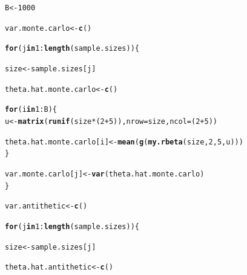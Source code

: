 \documentclass[11pt, a4paper]{article}\usepackage[]{graphicx}\usepackage[]{xcolor}
\makeatletter
\newcommand{\hlnum}[1]{\textcolor[rgb]{0.686,0.059,0.569}{#1}}%
\newcommand{\hlopt}[1]{\textcolor[rgb]{0,0,0}{#1}}%
\newcommand{\hldef}[1]{\textcolor[rgb]{0.345,0.345,0.345}{#1}}%
\newcommand{\hlkwa}[1]{\textcolor[rgb]{0.161,0.373,0.58}{\textbf{#1}}}%
\newcommand{\hlkwb}[1]{\textcolor[rgb]{0.69,0.353,0.396}{#1}}%
\newcommand{\hlkwc}[1]{\textcolor[rgb]{0.333,0.667,0.333}{#1}}%
\newcommand{\hlkwd}[1]{\textcolor[rgb]{0.737,0.353,0.396}{\textbf{#1}}}%
\newenvironment{kframe}{%
 \def\at@end@of@kframe{}%
 \ifinner\ifhmode%
  \def\at@end@of@kframe{\end{minipage}}%
  \begin{minipage}{\columnwidth}%
 \fi\fi%
 \def\FrameCommand##1{\hskip\@totalleftmargin \hskip-\fboxsep
 \colorbox{shadecolor}{##1}\hskip-\fboxsep
     \hskip-\linewidth \hskip-\@totalleftmargin \hskip\columnwidth}%
 \MakeFramed {\advance\hsize-\width
   \@totalleftmargin\z@ \linewidth\hsize
   \@setminipage}}%
 {\par\unskip\endMakeFramed%
 \at@end@of@kframe}
\newenvironment{knitrout}{}{} %
\makeatother
\begin{document}
\begin{enumerate}
\begin{knitrout}
\color{fgcolor}\begin{kframe}
\begin{alltt}
\hldef{B} \hlkwb{<-} \hlnum{1000}
\end{alltt}
\end{kframe}
\end{knitrout}

\begin{knitrout}
\color{fgcolor}\begin{kframe}
\begin{alltt}
\hldef{var.monte.carlo} \hlkwb{<-} \hlkwd{c}\hldef{()}

\hlkwa{for} \hldef{(j} \hlkwa{in} \hlnum{1}\hlopt{:}\hlkwd{length}\hldef{(sample.sizes)) \{}

  \hldef{size} \hlkwb{<-} \hldef{sample.sizes[j]}

  \hldef{theta.hat.monte.carlo} \hlkwb{<-} \hlkwd{c}\hldef{()}

  \hlkwa{for} \hldef{(i} \hlkwa{in} \hlnum{1}\hlopt{:}\hldef{B) \{}
    \hldef{u} \hlkwb{<-} \hlkwd{matrix}\hldef{(}\hlkwd{runif}\hldef{(size} \hlopt{*} \hldef{(}\hlnum{2} \hlopt{+} \hlnum{5}\hldef{)),} \hlkwc{nrow} \hldef{= size,} \hlkwc{ncol} \hldef{= (}\hlnum{2} \hlopt{+} \hlnum{5}\hldef{))}

    \hldef{theta.hat.monte.carlo[i]} \hlkwb{<-} \hlkwd{mean}\hldef{(}\hlkwd{g}\hldef{(}\hlkwd{my.rbeta}\hldef{(size,} \hlnum{2}\hldef{,} \hlnum{5}\hldef{, u)))}
  \hldef{\}}

  \hldef{var.monte.carlo[j]} \hlkwb{<-} \hlkwd{var}\hldef{(theta.hat.monte.carlo)}
\hldef{\}}
\end{alltt}
\end{kframe}
\end{knitrout}

\begin{knitrout}
\color{fgcolor}\begin{kframe}
\begin{alltt}
\hldef{var.antithetic} \hlkwb{<-} \hlkwd{c}\hldef{()}

\hlkwa{for} \hldef{(j} \hlkwa{in} \hlnum{1}\hlopt{:}\hlkwd{length}\hldef{(sample.sizes)) \{}

  \hldef{size} \hlkwb{<-} \hldef{sample.sizes[j]}

  \hldef{theta.hat.antithetic} \hlkwb{<-} \hlkwd{c}\hldef{()}


\end{alltt}
\end{kframe}
\end{knitrout}
\end{enumerate}
\end{document}
